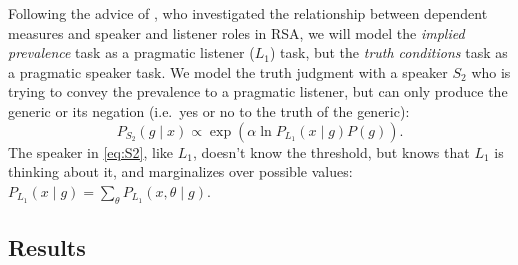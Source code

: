 \documentclass[10pt,letterpaper]{article}
\begin{document}
Following the advice of , who investigated the relationship between dependent measures and speaker and listener roles in RSA, we will model the \emph{implied prevalence} task as a pragmatic listener ($L_{1}$) task, but the \emph{truth conditions} task as a pragmatic speaker task. We model the truth judgment with a speaker $S_{2}$ who is trying to convey the prevalence to a pragmatic listener, but can only produce the generic or its negation (i.e.~yes or no to the truth of the generic):
\begin{equation} 
P_{S_{2}}(g \mid x) \propto \exp{(\alpha \ln{P_{L_{1}}(x \mid g) P(g)})}.
\label{eq:S2}
\end{equation}
The speaker in \eqref{eq:S2}, like $L_{1}$, doesn't know the threshold, but knows that $L_{1}$ is thinking about it, and marginalizes over possible values: $ P_{L_{1}}(x \mid g) = \sum_{\theta} P_{L_{1}}(x , \theta \mid g) $.


%			
%			




%	
%			
%			
%	
%				
%				


\subsection{Results}
\end{document}
